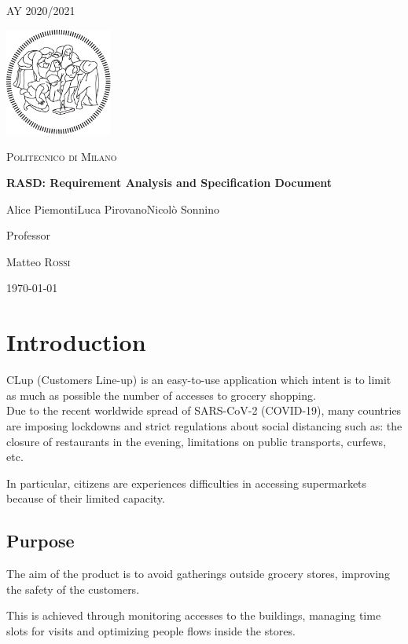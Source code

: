 \documentclass[12pt]{article}
\begin{document}
\begin{titlepage}
    \centering
    {\scshape\large AY 2020/2021 \par}
    \vfill
    \includegraphics[width=100pt]{assets/logo-polimi-new}\par\vspace{1cm}
    {\scshape\LARGE Politecnico di Milano \par}
    \vspace{1.5cm}
    {\huge\bfseries RASD\@: Requirement Analysis
        and Specification Document \par}
    \vspace{2cm}
    {\Large {Alice Piemonti\quad Luca Pirovano\quad Nicolò Sonnino}\par}
    \vfill
    {\large Professor\par
        Matteo \textsc{Rossi}}
    \vfill
    {\large \today \par}
\end{titlepage}
\tableofcontents
\newpage
\section{Introduction}
CLup (Customers Line-up) is an easy-to-use application which intent is to limit as much as possible the number of accesses to grocery shopping.\\

Due to the recent worldwide spread of SARS-CoV-2 (COVID-19), many countries are imposing lockdowns and strict regulations about social distancing such as: the closure of restaurants in the evening, limitations on public transports, curfews, etc.

In particular, citizens are experiences difficulties in accessing supermarkets because of their limited capacity.
\subsection{Purpose}
The aim of the product is to avoid gatherings outside grocery stores, improving the safety of the customers.

This is achieved through monitoring accesses to the buildings, managing time slots for visits and optimizing people flows inside the stores.\\
\end{document}
